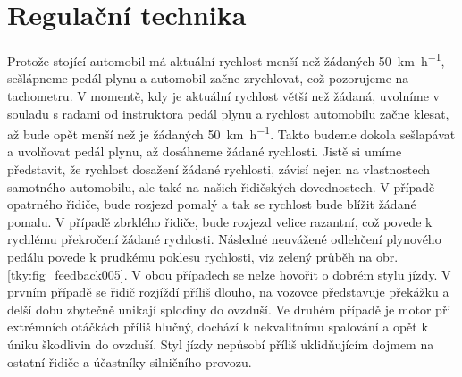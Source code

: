 \setchaptertoc
\chapter{Regulační technika}\label{tky:IchapIII}
    Protože stojící automobil má aktuální rychlost menší než žádaných \qty{50}{\km\per\hour},
    sešlápneme pedál plynu a automobil začne zrychlovat, což pozorujeme na tachometru. V momentě,
    kdy je aktuální rychlost větší než žádaná, uvolníme v souladu s radami od instruktora pedál
    plynu a rychlost automobilu začne klesat, až bude opět menší než je žádaných
    \qty{50}{\km\per\hour}. Takto budeme dokola sešlapávat a uvolňovat pedál plynu, až dosáhneme
    žádané rychlosti. Jistě si umíme představit, že rychlost dosažení žádané rychlosti, závisí nejen
    na vlastnostech samotného automobilu, ale také na našich řidičských dovednostech. V případě
    opatrného řidiče, bude rozjezd pomalý a tak se rychlost bude blížit žádané pomalu. V případě
    zbrklého řidiče, bude rozjezd velice razantní, což povede k rychlému překročení žádané
    rychlosti. Následné neuvážené odlehčení plynového pedálu povede k prudkému poklesu rychlosti,
    viz zelený průběh na obr. \ref{tky:fig_feedback005}. V obou případech se nelze hovořit o dobrém
    stylu jízdy. V prvním případě se řidič rozjíždí příliš dlouho, na vozovce představuje překážku a
    delší dobu zbytečně unikají splodiny do ovzduší. Ve druhém případě je motor při extrémních
    otáčkách příliš hlučný, dochází k nekvalitnímu spalování a opět k úniku škodlivin do ovzduší.
    Styl jízdy nepůsobí příliš uklidňujícím dojmem na ostatní řidiče a účastníky silničního provozu.

